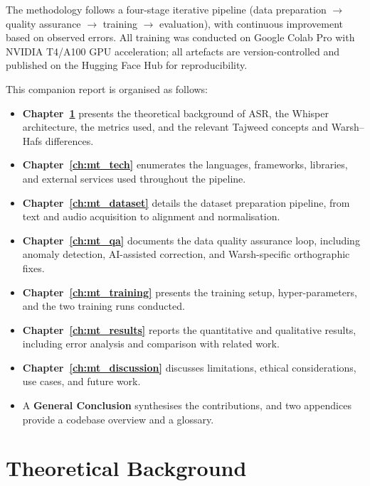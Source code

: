 The methodology follows a four-stage iterative pipeline (data preparation
$\rightarrow$ quality assurance $\rightarrow$ training $\rightarrow$
evaluation), with continuous improvement based on observed errors. All
training was conducted on Google Colab Pro with NVIDIA T4/A100 GPU
acceleration; all artefacts are version-controlled and published on the
Hugging Face Hub for reproducibility.

This companion report is organised as follows:
\begin{itemize}
  \item \textbf{Chapter~\ref{ch:mt_background}} presents the theoretical
        background of ASR, the Whisper architecture, the metrics used, and
        the relevant Tajweed concepts and Warsh--Hafs differences.
  \item \textbf{Chapter~\ref{ch:mt_tech}} enumerates the languages,
        frameworks, libraries, and external services used throughout the
        pipeline.
  \item \textbf{Chapter~\ref{ch:mt_dataset}} details the dataset
        preparation pipeline, from text and audio acquisition to alignment
        and normalisation.
  \item \textbf{Chapter~\ref{ch:mt_qa}} documents the data quality
        assurance loop, including anomaly detection, AI-assisted
        correction, and Warsh-specific orthographic fixes.
  \item \textbf{Chapter~\ref{ch:mt_training}} presents the training setup,
        hyper-parameters, and the two training runs conducted.
  \item \textbf{Chapter~\ref{ch:mt_results}} reports the quantitative and
        qualitative results, including error analysis and comparison with
        related work.
  \item \textbf{Chapter~\ref{ch:mt_discussion}} discusses limitations,
        ethical considerations, use cases, and future work.
  \item A \textbf{General Conclusion} synthesises the contributions, and
        two appendices provide a codebase overview and a glossary.
\end{itemize}

\chapter{Theoretical Background}
\label{ch:mt_background}

